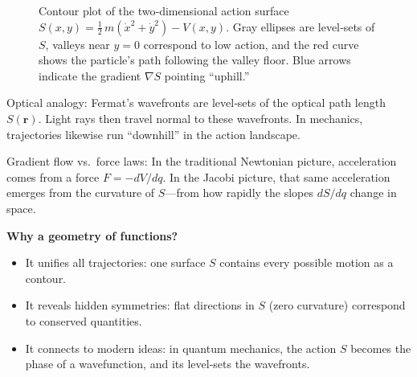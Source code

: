   \begin{figure}[H]
    \centering
    \caption{Contour plot of the two‐dimensional action surface 
    \(\displaystyle S(x,y)=\tfrac12\,m(\dot x^2+\dot y^2)-V(x,y)\). 
    Gray ellipses are level‐sets of \(S\), valleys near \(y=0\) correspond to low action, and the red curve shows the particle’s path following the valley floor.  Blue arrows indicate the gradient \(\nabla S\) pointing “uphill.”}
  \end{figure}


  Optical analogy: Fermat’s wavefronts are level‐sets of the optical path length \(S(\mathbf{r})\).  Light rays then travel normal to these wavefronts.  In mechanics, trajectories likewise run “downhill” in the action landscape.

  Gradient flow vs.\ force laws:  In the traditional Newtonian picture, acceleration comes from a force \(F = -dV/dq\).  In the Jacobi picture, that same acceleration emerges from the curvature of \(S\)—from how rapidly the slopes \(dS/dq\) change in space.

\textbf{Why a geometry of functions?}

\begin{itemize}
  \item It unifies all trajectories: one surface \(S\) contains every possible motion as a contour.
  \item It reveals hidden symmetries: flat directions in \(S\) (zero curvature) correspond to conserved quantities.
  \item It connects to modern ideas: in quantum mechanics, the action \(S\) becomes the phase of a wavefunction, and its level‐sets the wavefronts.
\end{itemize}

